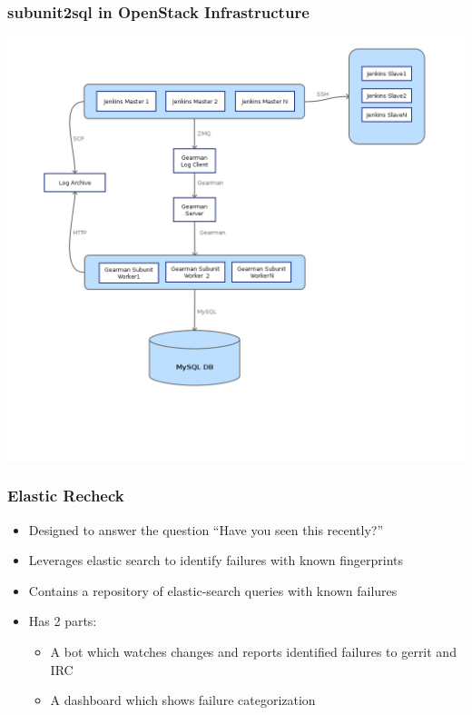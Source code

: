 \documentclass[aspectratio=169,11pt,hyperref={colorlinks=true}]{beamer}
\begin{document}
\begin{frame}
    \frametitle{subunit2sql in OpenStack Infrastructure}
    \begin{center}
        \includegraphics[height=1.0\textheight]{subunit2sql-collection.png}
    \end{center}
\end{frame}

\begin{frame}
  \frametitle{Elastic Recheck}
  \begin{itemize}
    \item Designed to answer the question ``Have you seen this recently?''
    \item Leverages elastic search to identify failures with known fingerprints
    \item Contains a repository of elastic-search queries with known failures
    \item Has 2 parts:
        \begin{itemize}
            \item A bot which watches changes and reports identified failures to gerrit and IRC
            \item A dashboard which shows failure categorization
        \end{itemize}
    \end{itemize}
\end{frame}
\end{document}

